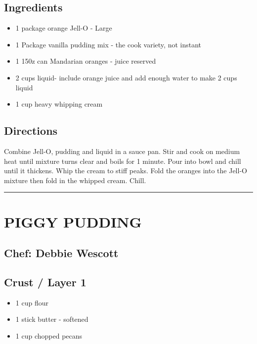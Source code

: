 \documentclass[
]{book}
\providecommand{\tightlist}{%
  \setlength{\itemsep}{0pt}\setlength{\parskip}{0pt}}
\begin{document}
\hypertarget{ingredients-86}{%
\subsection*{Ingredients}\label{ingredients-86}}


\begin{itemize}
\tightlist
\item
  1 package orange Jell-O - Large
\item
  1 Package vanilla pudding mix - the cook variety, not instant
\item
  1 150z can Mandarian oranges - juice reserved
\item
  2 cups liquid- include orange juice and add enough water to make 2 cups liquid
\item
  1 cup heavy whipping cream
\end{itemize}

\hypertarget{directions-86}{%
\subsection*{Directions}\label{directions-86}}


Combine Jell-O, pudding and liquid in a sauce pan. Stir and cook on medium heat until mixture turns clear and boils for 1 minute. Pour into bowl and chill until it thickens. Whip the cream to stiff peaks. Fold the oranges into the Jell-O mixture then fold in the whipped cream. Chill.

\begin{center}\rule{0.5\linewidth}{0.5pt}\end{center}

\hypertarget{piggy-pudding}{%
\section*{PIGGY PUDDING}\label{piggy-pudding}}


\hypertarget{chef-debbie-wescott-4}{%
\subsection*{Chef: Debbie Wescott}\label{chef-debbie-wescott-4}}


\hypertarget{crust-layer-1}{%
\subsection*{Crust / Layer 1}\label{crust-layer-1}}


\begin{itemize}
\tightlist
\item
  1 cup flour
\item
  1 stick butter - softened
\item
  1 cup chopped pecans
\end{itemize}
\end{document}
